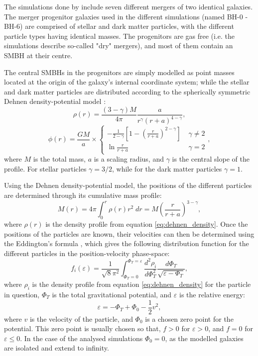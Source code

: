 \documentclass[english, oneside]{HYgradu}
\begin{document}
The simulations done by \cite{Rantala2018} include seven different mergers of two identical galaxies. The merger progenitor galaxies used in the different simulations (named BH-0 - BH-6) are comprised of stellar and dark matter particles, with the different particle types having identical masses. The progenitors are gas free (i.e. the simulations describe so-called "dry" mergers), and most of them contain an SMBH at their centre.

The central SMBHs in the progenitors are simply modelled as point masses located at the origin of the galaxy's internal coordinate system; while the stellar and dark matter particles are distributed according to the spherically symmetric Dehnen density-potential model \citep{Dehnen1993}:
\begin{equation}
\rho(r) = \frac{(3-\gamma)M}{4\pi} \frac{a}{r^\gamma (r+a)^{4-\gamma}}, \label{eq:dehnen_density}
\end{equation}
\begin{equation}
\phi(r) = \frac{GM}{a} \times 
\begin{cases}
	-\frac{1}{2-\gamma} \left[ 1 - \left( \frac{r}{r+a} \right)^{2-\gamma} \right] & \; \gamma \neq 2 \\
	\ln \frac{r}{r+a}	 & \; \gamma = 2
\end{cases},
\label{eq:dehnen_potential}
\end{equation}
where $M$ is the total mass, $a$ is a scaling radius, and $\gamma$ is the central slope of the profile. For stellar particles $\gamma = 3/2$, while for the dark matter particles $\gamma = 1$. 

Using the Dehnen density-potential model, the positions of the different particles are determined through its cumulative mass profile:
\begin{equation}
M(r) = 4\pi \int^r_0 \rho(r)r^2 \;dr = M \left( \frac{r}{r+a} \right)^{3-\gamma}, \label{eq:cumulative_mass}
\end{equation}
where $\rho(r)$ is the density profile from equation \ref{eq:dehnen_density}. Once the positions of the particles are known, their velocities can then be determined using the Eddington's formula \citep{BinneyTremaine}, which gives the following distribution function for the different particles in the position-velocity phase-space:
\begin{equation}
f_i(\varepsilon) = \frac{1}{\sqrt{8}\pi^2} \int^{\Phi_T = \varepsilon}_{\Phi_T = 0} \frac{d^2\rho_i}{d\Phi^2_T}
\frac{d\Phi_T}{\sqrt{\varepsilon - \Phi_T}}, \label{eq:eddington_form}
\end{equation}
where $\rho_i$ is the density profile from equation \ref{eq:dehnen_density} for the particle in question, $\Phi_T$ is the total gravitational potential, and $\varepsilon$ is the relative energy:
\begin{equation}
\varepsilon = -\Phi_T + \Phi_0 - \frac{1}{2} v^2,
\end{equation}
where $v$ is the velocity of the particle, and $\Phi_0$ is a chosen zero point for the potential. This zero point is usually chosen so that, $f > 0$ for $\varepsilon > 0$, and $f = 0$ for $\varepsilon \leq 0$. In the case of the analysed simulations $\Phi_0 = 0$, as the modelled galaxies are isolated and extend to infinity.
\end{document}
